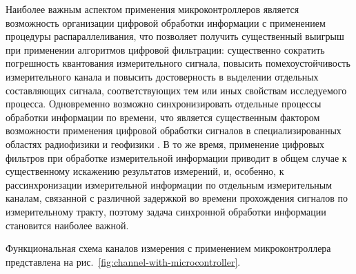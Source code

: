\documentclass[a4paper, 14pt, titlepage]{extarticle}
\begin{document}
  Наиболее важным аспектом применения микроконтроллеров является возможность организации цифровой
  обработки информации с применением процедуры распараллеливания, что позволяет получить
  существенный выигрыш при применении алгоритмов цифровой фильтрации: существенно сократить
  погрешность квантования измерительного сигнала, повысить помехоустойчивость измерительного канала
  и повысить достоверность в выделении отдельных составляющих сигнала, соответствующих тем или иных
  свойствам исследуемого процесса. Одновременно возможно синхронизировать отдельные процессы
  обработки информации по времени, что является существенным фактором возможности применения
  цифровой обработки сигналов в специализированных областях радиофизики и геофизики
  \cite{rathore-digital}. В то же время, применение цифровых фильтров при обработке измерительной
  информации приводит в общем случае к существенному искажению результатов измерений, и, особенно, к
  рассинхронизации измерительной информации по отдельным измерительным каналам, связанной с
  различной задержкой во времени прохождения сигналов по измерительному тракту, поэтому задача
  синхронной обработки информации становится наиболее важной.

  Функциональная схема каналов измерения с применением микроконтроллера  представлена на
  рис.~\ref{fig:channel-with-microcontroller}.
\end{document}
